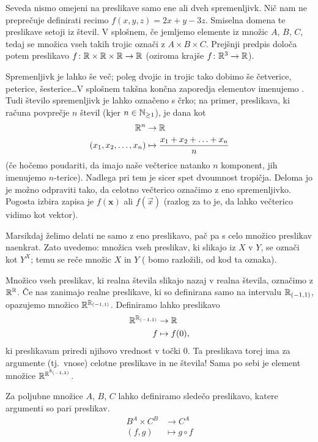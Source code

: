 Seveda nismo omejeni na preslikave samo ene ali dveh spremenljivk. Nič nam ne preprečuje definirati recimo $f(x, y, z) = 2x + y - 3z$. Smiselna domena te preslikave setoji iz  števil. V splošnem, če jemljemo elemente iz množic $A$, $B$, $C$, tedaj se množica vseh takih trojic označi z $A \times B \times C$. Prejšnji predpis določa potem preslikavo $f\colon \mathbb{R} \times \mathbb{R} \times \mathbb{R} \to \mathbb{R}$ (oziroma krajše $f\colon \mathbb{R}^3 \to \mathbb{R}$).

Spremenljivk je lahko še več; poleg dvojic in trojic tako dobimo še četverice, peterice, šesterice\ldots V splošnem takšna končna zaporedja elementov imenujemo . Tudi število spremenljivk je lahko označeno s črko; na primer, preslikava, ki računa povprečje $n$ števil (kjer $n \in \mathbb{N}_{\geq 1}$), je dana kot
\begin{align*}
\mathbb{R}^n &\to \mathbb{R} \\
(x_1, x_2, \ldots, x_n) &\mapsto \frac{x_1 + x_2 + \ldots + x_n}{n}
\end{align*}
(če hočemo poudariti, da imajo naše večterice natanko $n$ komponent, jih imenujemo $n$-terice). Nadlega pri tem je sicer spet dvoumnost tropičja. Deloma jo je možno odpraviti tako, da celotno večterico označimo z eno spremenljivko. Pogosta izbira zapisa je $f(\bm{x})$ ali $f(\vec{x})$ (razlog za to je, da lahko večterico vidimo kot vektor).

Marsikdaj želimo delati ne samo z eno preslikavo, pač pa s celo množico preslikav naenkrat. Zato uvedemo: množica vseh preslikav, ki slikajo iz $X$ v $Y$, se označi kot $Y^X$; temu se reče  množic $X$ in $Y$ ( bomo razložili, od kod ta oznaka).

\begin{zgled}
Množico vseh preslikav, ki realna števila slikajo nazaj v realna števila, označimo z $\mathbb{R}^{\mathbb{R}}$. Če nas zanimajo realne preslikave, ki so definirana samo na intervalu ${\mathbb{R}}_{(-1, 1)}$, opazujemo množico $\mathbb{R}^{{\mathbb{R}}_{(-1, 1)}}$. Definiramo lahko preslikavo
\begin{align*}
\mathbb{R}^{{\mathbb{R}}_{(-1, 1)}} &\to \mathbb{R} \\
f &\mapsto f(0),
\end{align*}
ki preslikavam priredi njihovo vrednost v točki $0$. Ta preslikava torej ima za argumente (tj.~vnose) celotne preslikave in ne števila! Sama po sebi je element množice $\mathbb{R}^{\mathbb{R}^{{\mathbb{R}}_{(-1, 1)}}}$.
\end{zgled}

\begin{zgled}
Za poljubne množice $A$, $B$, $C$ lahko definiramo sledečo preslikavo, katere argumenti so pari preslikav.
\begin{align*}
B^A \times C^B &\to C^A \\
(f, g) &\mapsto g \circ f
\end{align*}
\end{zgled}


